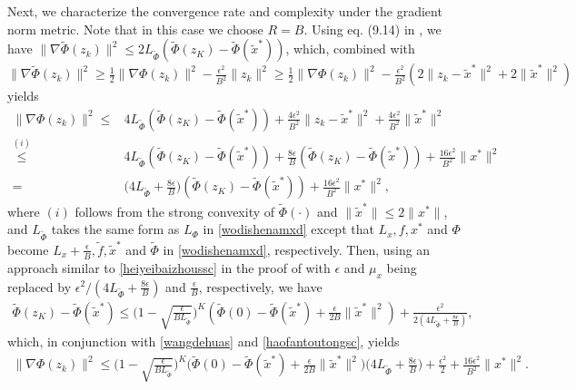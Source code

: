 \documentclass{osudissert96}
\begin{document}
Next, we characterize the convergence rate and complexity under the gradient norm metric.  Note that in this case we choose $R=B$. 
Using eq. (9.14) in \cite{boyd2004convex}, we have $\|\nabla\widetilde \Phi (z_k)\|^2\leq 2L_{\widetilde \Phi}(\widetilde\Phi(z_K)- \widetilde\Phi(\widetilde x^*)) $, which, combined with  
$\|\nabla\widetilde \Phi (z_k)\|^2 \geq \frac{1}{2}\|\nabla\Phi (z_k)\|^2 - \frac{\epsilon^2}{B^2}\|z_k\|^2\geq  \frac{1}{2}\|\nabla\Phi (z_k)\|^2 -  \frac{\epsilon^2}{B^2}(2\|z_k-\widetilde x^*\|^2 + 2\|\widetilde x^*\|^2)$
yields
\begin{align}\label{haofantoutongsc}
\|\nabla \Phi (z_k)\|^2\leq& 4L_{\widetilde \Phi}(\widetilde\Phi(z_K)- \widetilde\Phi(\widetilde x^*)) +\frac{4\epsilon^2}{B^2}\|z_k-\widetilde x^*\|^2 +\frac{4\epsilon^2}{B^2} \|\widetilde x^*\|^2 \nonumber
\\\overset{(i)}\leq&4L_{\widetilde \Phi}(\widetilde\Phi(z_K)- \widetilde\Phi(\widetilde x^*)) + \frac{8\epsilon}{B}(\widetilde\Phi(z_K)- \widetilde\Phi(\widetilde x^*)) + \frac{16\epsilon^2}{B^2} \| x^*\|^2  \nonumber
\\=& \Big(4L_{\widetilde \Phi}+ \frac{8\epsilon}{B}\Big)(\widetilde\Phi(z_K)- \widetilde\Phi(\widetilde x^*)) + \frac{16\epsilon^2}{B^2} \| x^*\|^2,  
\end{align}
where $(i)$ follows from the strong convexity of $\widetilde \Phi(\cdot)$ and $\|\widetilde x^*\|\leq 2\|x^*\|$, and $L_{\widetilde \Phi}$ takes the same form as $L_\Phi$ in \cref{wodishenamxd} except that $L_x,f,x^*$ and $\Phi$ become $L_x+\frac{\epsilon}{B},\widetilde f,\widetilde x^*$ and $\widetilde \Phi$ in \cref{wodishenamxd}, respectively.  Then, using an approach similar to \cref{heiyeibaizhoussc} in the proof of  with $\epsilon$ and $\mu_x$ being replaced by $\epsilon^2/(4L_{\widetilde \Phi}+ \frac{8\epsilon}{B})$ and $\frac{\epsilon}{B}$, respectively, we have
\begin{align*}
\widetilde\Phi(z_K)- \widetilde\Phi(\widetilde x^*) \leq \Big(1 -\sqrt{\frac{\epsilon}{BL_{\widetilde \Phi}}} \Big)^{K}(\widetilde\Phi(0) -\widetilde\Phi(\widetilde x^*)+\frac{\epsilon}{2B} \|\widetilde x^*\|^2) +\frac{\epsilon^2}{2(4L_{\widetilde \Phi}+ \frac{8\epsilon}{B})},
\end{align*}
which, in conjunction with \cref{wangdehuas} and \cref{haofantoutongsc}, yields 
{\small\begin{align*}
\|\nabla \Phi (z_k)\|^2\leq \Big(1 -\sqrt{\frac{\epsilon}{BL_{\widetilde \Phi}}} \Big)^{K}\Big(\widetilde\Phi(0) -\widetilde\Phi(\widetilde x^*)+\frac{\epsilon}{2B} \|\widetilde x^*\|^2\Big) \Big(4L_{\widetilde \Phi}+ \frac{8\epsilon}{B}\Big)  + \frac{\epsilon^2}{2} + \frac{16\epsilon^2}{B^2} \| x^*\|^2.
\end{align*}}
\end{document}
